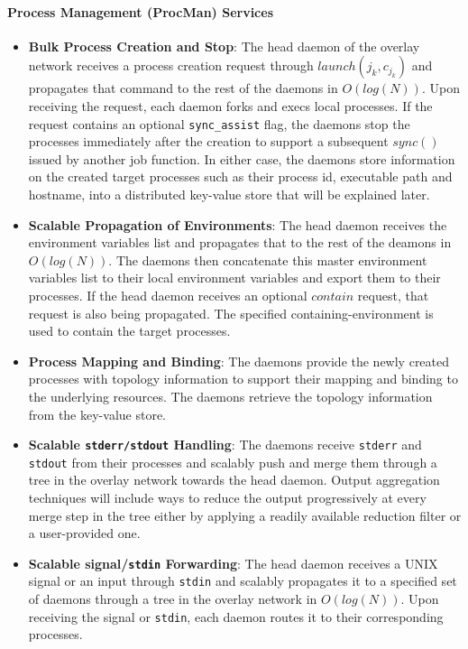 \paragraph{Process Management (ProcMan) Services}
\label{sect:procman}

\begin{itemize}
\item{{\bf Bulk Process Creation and Stop}: The head daemon of the overlay network
receives a process creation request
through $launch(j_k, c_{j_k})$ and propagates that command to the rest of the daemons
in $O(log(N))$. Upon receiving the request, each daemon forks and execs
local processes. If the request contains an optional {\tt sync\_assist} flag, the daemons
stop the processes immediately after the creation to support a subsequent $sync()$ issued
by another job function. In either case, the daemons store
information on the created target processes such as their process id, executable path
and hostname, into a distributed key-value store that will be explained later.}

\item{{\bf Scalable Propagation of Environments}: The head daemon receives the environment
variables list and propagates that to the rest of the deamons
in $O(log(N))$. The daemons then concatenate this master environment variables
list to their local environment variables and export them to their
processes. If the head daemon receives an optional $contain$ request, that
request is also being propagated. The specified containing-environment is used to contain
the target processes.}

\item{{\bf Process Mapping and Binding}: The daemons provide the newly created processes
with topology information to support their mapping and binding to the underlying 
resources. The daemons retrieve the topology information from the key-value store.}

\item{{\bf Scalable {\tt stderr/stdout} Handling}: The daemons receive
{\tt stderr} and {\tt stdout}
from their processes and scalably push and merge them through a tree in the overlay
network towards the head daemon. Output aggregation techniques
will include ways to reduce the output progressively at every merge step
in the tree either by applying a readily available
reduction filter or a user-provided one.}

\item{{\bf Scalable signal/{\tt stdin} Forwarding}: The head daemon receives a UNIX signal
or an input through {\tt stdin} and scalably propagates it to a specified set of daemons
through a tree in the overlay network in $O(log(N))$. Upon receiving the signal or {\tt stdin},
each daemon routes it to their corresponding processes.}


\end{itemize}

